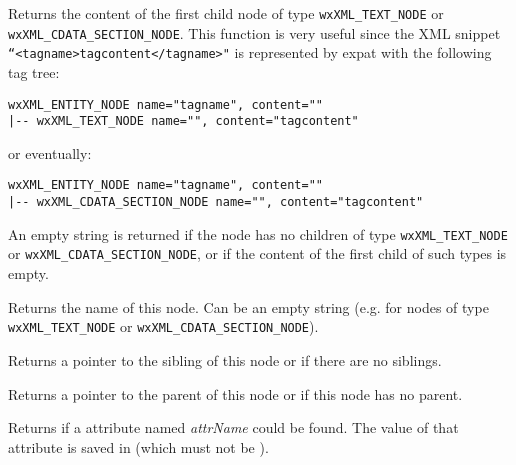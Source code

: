 \label{wxxmlnodegetnodecontent}


Returns the content of the first child node of type \texttt{wxXML\_TEXT\_NODE} or \texttt{wxXML\_CDATA\_SECTION\_NODE}.
This function is very useful since the XML snippet \texttt{``<tagname>tagcontent</tagname>"} is represented by
expat with the following tag tree:

\begin{verbatim}
wxXML_ENTITY_NODE name="tagname", content=""
|-- wxXML_TEXT_NODE name="", content="tagcontent"
\end{verbatim}

or eventually:

\begin{verbatim}
wxXML_ENTITY_NODE name="tagname", content=""
|-- wxXML_CDATA_SECTION_NODE name="", content="tagcontent"
\end{verbatim}

An empty string is returned if the node has no children of type \texttt{wxXML\_TEXT\_NODE} or \texttt{wxXML\_CDATA\_SECTION\_NODE}, or if the content of the first child of such types is empty.


\label{wxxmlnodegetname}


Returns the name of this node. Can be an empty string (e.g. for nodes of type {\tt wxXML\_TEXT\_NODE} or {\tt wxXML\_CDATA\_SECTION\_NODE}).

\label{wxxmlnodegetnext}


Returns a pointer to the sibling of this node or \NULL if there are no siblings.

\label{wxxmlnodegetparent}


Returns a pointer to the parent of this node or \NULL if this node has no parent.

\label{wxxmlnodegetattribute}


Returns \true if a attribute named {\it attrName} could be found.
The value of that attribute is saved in  (which
must not be \NULL).

